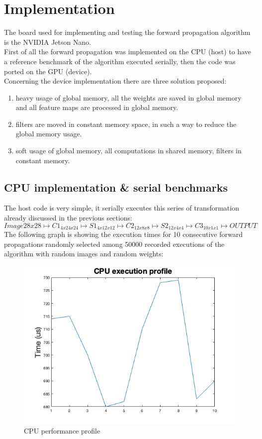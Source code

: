 \documentclass[a4paper]{report}
\begin{document}
\section{Implementation}
The board used for implementing and testing the forward propagation algorithm is the NVIDIA Jetson Nano.\\
First of all the forward propagation was implemented on the CPU (host) to have a reference benchmark of the algorithm executed serially, then the code was ported on the GPU (device).\\
Concerning the device implementation there are three solution proposed:
\begin{enumerate}
\item heavy usage of global memory, all the weights are saved in global memory and all feature maps are processed in global memory.
\item filters are moved in constant memory space, in such a way to reduce the global memory usage.
\item soft usage of global memory, all computations in shared memory, filters in constant memory.
\end{enumerate}

\subsection{CPU implementation \& serial benchmarks}
The host code is very simple, it serially executes this series of transformation already discussed in the previous sections:
\[ Image28x28 \mapsto C1_{4x24x24} \mapsto S1_{4x12x12} \mapsto C2_{12x8x8} \mapsto S2_{12x4x4} \mapsto C3_{10x1x1} \mapsto OUTPUT \]
The following graph is showing the execution times for 10 consecutive forward propagations randomly selected among 50000 recorded executions of the algorithm with random images and random weights:

\begin{figure}[!h]
\centering
\includegraphics[scale=0.5]{docs/hostexec.png} 
\caption{CPU performance profile}
\label{fig_hp}
\end{figure}
\end{document}
